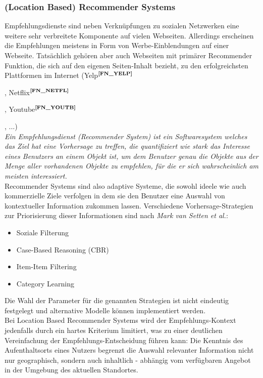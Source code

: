 \subsubsection{(Location Based) Recommender Systems}\label{2_RECSYS}
Empfehlungsdienste sind neben Verknüpfungen zu sozialen Netzwerken eine weitere sehr verbreitete Komponente auf vielen Webseiten. Allerdings erscheinen die Empfehlungen meistens in Form von Werbe-Einblendungen auf einer Webseite. Tatsächlich gehören aber auch Webseiten mit primärer Recommender Funktion, die sich auf den eigenen Seiten-Inhalt bezieht, zu den erfolgreichsten Plattformen im Internet (Yelp$^{\textbf{\ref{FN_YELP}}}$%
\addtocounter{footnote}{1}%
, Netflix$^{\textbf{\ref{FN_NETFL}}}$%
\addtocounter{footnote}{1}%
, Youtube$^{\textbf{\ref{FN_YOUTB}}}$%
\addtocounter{footnote}{1}%
, ...)\\ 
\textit{Ein Empfehlungsdienst (Recommender System) ist ein Softwaresystem welches das Ziel hat eine Vorhersage zu treffen, die quantifiziert wie stark das Interesse eines Benutzers an einem Objekt ist, um dem Benutzer genau die Objekte aus der Menge aller vorhandenen Objekte zu empfehlen, für die er sich wahrscheinlich am meisten interessiert.}\cite{WIKI:RECSYS}\\
Recommender Systems sind also adaptive Systeme, die sowohl ideele wie auch kommerzielle Ziele verfolgen
in dem sie den Benutzer eine Auswahl von kontextueller Information zukommen lassen.
Verschiedene Vorhersage-Strategien zur Priorisierung dieser Informationen sind nach \textit{Mark van Setten et al.}\cite{COMPASS:AH}: 
\begin{itemize}[leftmargin=*,noitemsep,topsep=1ex,parsep=0pt,partopsep=0pt]
\item Soziale Filterung
\item Case-Based Reasoning (CBR)
\item Item-Item Filtering
\item Category Learning
\end{itemize}
Die Wahl der Parameter für die genannten Strategien ist nicht eindeutig festgelegt und alternative Modelle können implementiert werden.\\ 
Bei Location Based Recommender Systems wird der Empfehlungs-Kontext jedenfalls durch ein hartes Kriterium limitiert, was zu einer deutlichen Vereinfachung der Empfehlungs-Entscheidung führen kann: Die Kenntnis des Aufenthaltsorts eines Nutzers begrenzt die Auswahl relevanter Information nicht nur geographisch, sondern auch inhaltlich - abhängig vom verfügbaren Angebot in der Umgebung des aktuellen Standortes.

